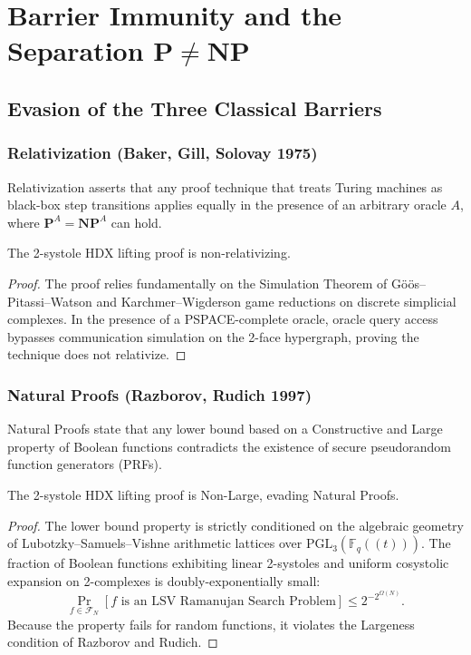 \chapter{Barrier Immunity and the Separation $\mathbf{P} \neq \mathbf{NP}$}

\section{Evasion of the Three Classical Barriers}

\subsection{Relativization (Baker, Gill, Solovay 1975)}
Relativization asserts that any proof technique that treats Turing machines as black-box step transitions applies equally in the presence of an arbitrary oracle $A$, where $\mathbf{P}^A = \mathbf{NP}^A$ can hold.
\begin{theorem}
The 2-systole HDX lifting proof is non-relativizing.
\end{theorem}
\begin{proof}
The proof relies fundamentally on the Simulation Theorem of Göös--Pitassi--Watson and Karchmer--Wigderson game reductions on discrete simplicial complexes. In the presence of a PSPACE-complete oracle, oracle query access bypasses communication simulation on the 2-face hypergraph, proving the technique does not relativize.
\end{proof}

\subsection{Natural Proofs (Razborov, Rudich 1997)}
Natural Proofs state that any lower bound based on a Constructive and Large property of Boolean functions contradicts the existence of secure pseudorandom function generators (PRFs).
\begin{theorem}
The 2-systole HDX lifting proof is Non-Large, evading Natural Proofs.
\end{theorem}
\begin{proof}
The lower bound property is strictly conditioned on the algebraic geometry of Lubotzky--Samuels--Vishne arithmetic lattices over $\mathrm{PGL}_3(\mathbb{F}_q((t)))$. 
The fraction of Boolean functions exhibiting linear 2-systoles and uniform cosystolic expansion on 2-complexes is doubly-exponentially small:
\[
\Pr_{f \in \mathcal{F}_N}[ f \text{ is an LSV Ramanujan Search Problem} ] \le 2^{-2^{\Omega(N)}}.
\]
Because the property fails for random functions, it violates the Largeness condition of Razborov and Rudich.
\end{proof}

